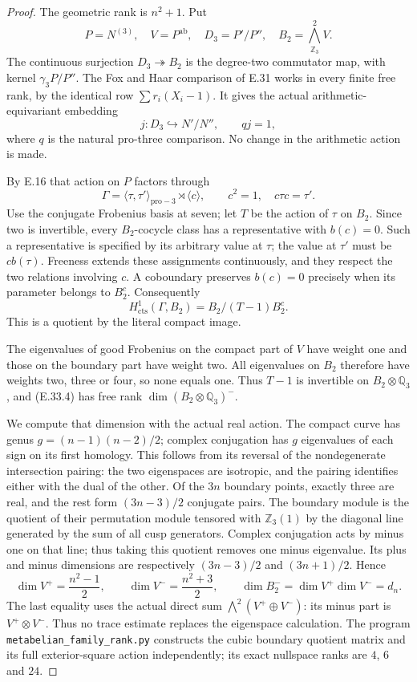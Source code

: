 \documentclass[11pt,oneside]{article}
\begin{document}
\begin{proof}
The geometric rank is $n^2+1$. Put
\[
 P=N^{(3)},\quad V=P^{\mathrm{ab}},\quad
 D_3=P'/P'',\quad B_2=\bigwedge^2_{\mathbb Z_3}V.
\]
The continuous surjection $D_3\twoheadrightarrow B_2$
is the degree-two commutator map, with kernel
$\gamma_3P/P''$. The Fox and Haar comparison of E.31
works in every finite free rank, by the identical
row $\sum r_i(X_i-1)$. It gives the actual
arithmetic-equivariant embedding
\[
 j:D_3\hookrightarrow N'/N'',
 \qquad qj=1,
 \tag{E.33.2}
\]
where $q$ is the natural pro-three comparison.
No change in the arithmetic action is made.

By E.16 that action on $P$ factors through
\[
 \Gamma=\langle\tau,\tau'\rangle_{\mathrm{pro}-3}
                 \rtimes\langle c\rangle,
 \qquad c^2=1,\quad c\tau c=\tau'.
 \tag{E.33.3}
\]
Use the conjugate Frobenius basis at seven; let
$T$ be the action of $\tau$ on $B_2$. Since two is
invertible, every $B_2$-cocycle class has a
representative with $b(c)=0$. Such a representative
is specified by its arbitrary value at $\tau$;
the value at $\tau'$ must be $c b(\tau)$. Freeness
extends these assignments continuously, and they
respect the two relations involving $c$. A
coboundary preserves $b(c)=0$ precisely when its
parameter belongs to $B_2^c$. Consequently
\[
 H^1_{\mathrm{cts}}(\Gamma,B_2)
       =B_2/(T-1)B_2^c.
 \tag{E.33.4}
\]
This is a quotient by the literal compact image.

The eigenvalues of good Frobenius on the compact
part of $V$ have weight one and those on the
boundary part have weight two. All eigenvalues
on $B_2$ therefore have weights two, three or
four, so none equals one. Thus $T-1$ is invertible
on $B_2\otimes\mathbb Q_3$, and (E.33.4) has
free rank $\dim(B_2\otimes\mathbb Q_3)^-$.

We compute that dimension with the actual real
action. The compact curve has genus
$g=(n-1)(n-2)/2$; complex conjugation has
$g$ eigenvalues of each sign on its first
homology. This follows from its reversal of
the nondegenerate intersection pairing: the
two eigenspaces are isotropic, and the pairing
identifies either with the dual of the other.
Of the $3n$ boundary points, exactly three
are real, and the rest form $(3n-3)/2$
conjugate pairs. The boundary module is the
quotient of their permutation module tensored
with $\mathbb Z_3(1)$ by the diagonal line
generated by the sum of all cusp generators.
Complex conjugation acts by minus one on that
line; thus taking this quotient removes one
minus eigenvalue.
Its plus and minus dimensions are respectively
$(3n-3)/2$ and $(3n+1)/2$. Hence
\[
 \dim V^+=\frac{n^2-1}2,
 \qquad
 \dim V^-=\frac{n^2+3}2,
 \qquad
 \dim B_2^-=\dim V^+\dim V^-=d_n.
 \tag{E.33.5}
\]
The last equality uses the actual direct sum
$\bigwedge^2(V^+\oplus V^-)$: its minus part is
$V^+\otimes V^-$. Thus no trace estimate replaces
the eigenspace calculation.
The program \texttt{metabelian\_family\_rank.py}
constructs the cubic boundary quotient matrix
and its full exterior-square action independently;
its exact nullspace ranks are $4$, $6$ and $24$.


\end{proof}
\end{document}

